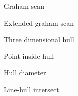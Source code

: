 
\begin{algorithm}{Graham scan}
\end{algorithm}

\begin{algorithm}{Extended graham scan}
\end{algorithm}

\begin{algorithm}{Three dimensional hull}
\end{algorithm}

\begin{algorithm}{Point inside hull}
\end{algorithm}

\begin{algorithm}{Hull diameter}
\end{algorithm}

\begin{algorithm}{Line-hull intersect}
\end{algorithm}

